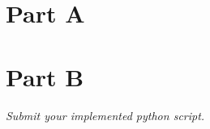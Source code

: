 \documentclass[12pt,twoside]{article}
\begin{document}

\begin{problems}

\section*{Part A}

\problem  %

\begin{problemparts}
\problempart  %
\problempart  %
\problempart  %
\problempart  %
\end{problemparts}

\problem  %

\begin{problemparts}
\problempart  %
\problempart  %
\problempart  %
\problempart  %
\problempart  %
\end{problemparts}

\problem  %
\begin{problemparts}
\problempart  %
\problempart  %
\problempart  %
\problempart  %
\problempart  %
\end{problemparts}

\section*{Part B}
\problem  %
\emph{Submit your implemented python script.}
\end{problems}
\end{document}
